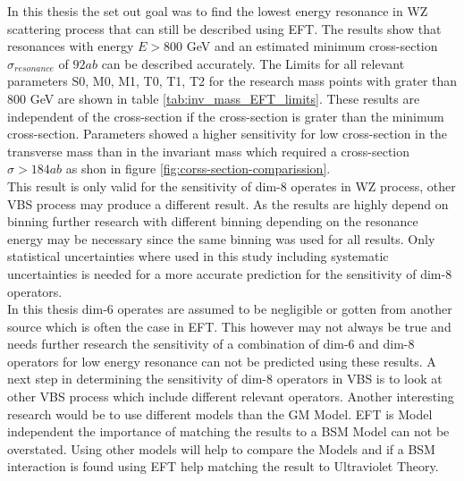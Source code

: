 \documentclass[../Bachelorarbeit.tex]{subfiles}
\begin{document}
In this thesis the set out goal was to find the lowest energy resonance in WZ scattering process that can still be described using EFT.
The results show that resonances with energy $E>800$ GeV and an estimated minimum cross-section $\sigma_{resonance}$ of $92 ab$ can be described accurately.
The Limits for all relevant parameters S0, M0, M1, T0, T1, T2 for the research mass points with grater than 800 GeV are shown in table \ref{tab:inv_mass_EFT_limits}.
These results are independent of the cross-section if the cross-section is grater than the minimum cross-section. Parameters showed a higher sensitivity for low cross-section
in the transverse mass than in the invariant mass which required a cross-section $\sigma>184 ab$ as shon in figure \ref{fig:corss-section-comparission}.\\
This result is only valid for the sensitivity of dim-8 operates in WZ process, other VBS process may produce a different result.
As the results are highly depend on binning further research with different binning depending on the resonance energy may be necessary since the same binning was used for all results.
Only statistical uncertainties where used in this study including systematic uncertainties is needed for a more accurate prediction for the sensitivity of dim-8 operators.\\
In this thesis dim-6 operates are assumed to be negligible or gotten from another source which is often the case in EFT.
This however may not always be true and needs further research the sensitivity of a combination of dim-6 and dim-8 operators for low energy resonance can not be predicted using these results.
A next step in determining the sensitivity of dim-8 operators in VBS is to look at other VBS process which include different relevant operators.
Another interesting research would be to use different models than the GM Model. EFT is Model independent the importance of matching the results to a BSM Model can not be overstated.
Using other models will help to compare the Models and if a BSM interaction is found using EFT help matching the result to Ultraviolet Theory.
\end{document}
